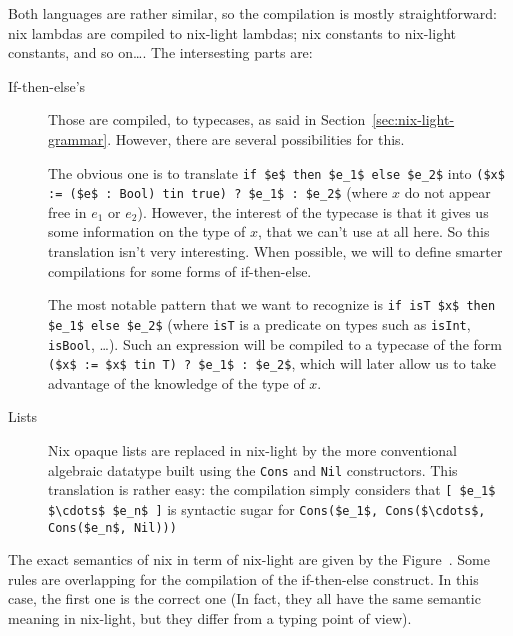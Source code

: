 Both languages are rather similar, so the compilation is mostly
straightforward: nix lambdas are compiled to nix-light lambdas; nix constants
to nix-light constants, and so on\ldots. The intersesting parts are:

\begin{description}
  \item[If-then-else's] Those are compiled, to typecases, as said in
    Section~\ref{sec:nix-light-grammar}. However, there are several
    possibilities for this.

    The obvious one is to translate \lstinline{if $e$ then $e_1$ else $e_2$} into
    \lstinline{($x$ := ($e$ : Bool) tin true) ? $e_1$ : $e_2$} (where $x$ do not appear
    free in $e_1$ or $e_2$).
    However, the interest of the typecase is that it gives us some information
    on the type of $x$, that we can't use at all here. So this translation
    isn't very interesting.
    When possible, we will  to define smarter compilations for some forms of
    if-then-else.

    The most notable pattern that we want to recognize is
    \lstinline{if isT $x$ then $e_1$ else $e_2$}
    (where \lstinline{isT} is a predicate on types such as
    \lstinline{isInt}, \lstinline{isBool}, \ldots).
    Such an expression will be compiled to a typecase of the form
    \lstinline{($x$ := $x$ tin T) ? $e_1$ : $e_2$}, which will later allow us to take
    advantage of the knowledge of the type of $x$.

  \item[Lists] Nix opaque lists are replaced in nix-light by the more
    conventional algebraic datatype built using the \lstinline{Cons} and
    \lstinline{Nil} constructors.
    This translation is rather easy: the compilation simply considers that
    \lstinline{[ $e_1$ $\cdots$ $e_n$ ]} is syntactic sugar for
    \lstinline{Cons($e_1$, Cons($\cdots$, Cons($e_n$, Nil)))} %
\end{description}

The exact semantics of nix in term of nix-light are given by the
Figure~.
Some rules are overlapping for the compilation of the if-then-else
construct. In this case, the first one is the correct one (In fact, they all
have the same semantic meaning in nix-light, but they differ from a typing
point of view).

